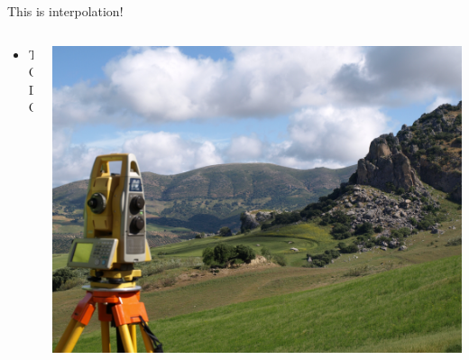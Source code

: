 \begin{frame}{This is interpolation!}
\begin{columns}[T] %
	\begin{column}{.56\textwidth}
		\begin{itemize}
			\item TODO
		\end{itemize}
	\end{column}%
	\hfill%
	\begin{column}{.48\textwidth}
		\includegraphics[width=\linewidth]{images/background}
	\end{column}%
\end{columns}
\end{frame}